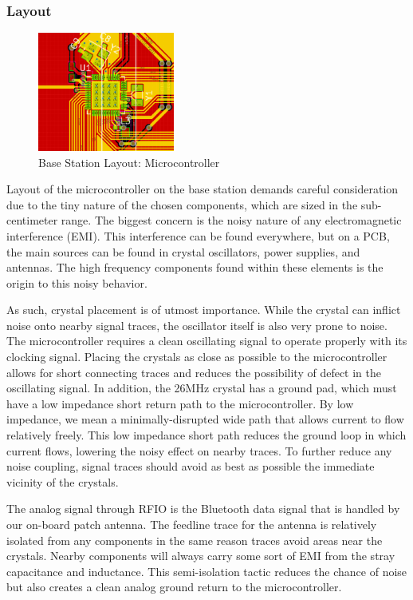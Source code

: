\documentclass[journal,compsoc]{IEEEtran}
\begin{document}
\subsubsection{Layout}

\begin{figure}[ht] 	%
\centering
\includegraphics[width=0.4\textwidth]{base-layout-uc.PNG}
\caption{ \space Base Station Layout: Microcontroller}
\label{base-lay-uc}
\end{figure}

Layout of the microcontroller on the base station demands careful consideration due to the tiny nature of the chosen components, which are sized in the sub-centimeter range. The biggest concern is the noisy nature of any electromagnetic interference (EMI). This interference can be found everywhere, but on a PCB, the main sources can be found in crystal oscillators, power supplies, and antennas. The high frequency components found within these elements is the origin to this noisy behavior.

As such, crystal placement is of utmost importance. While the crystal can inflict noise onto nearby signal traces, the oscillator itself is also very prone to noise. The microcontroller requires a clean oscillating signal to operate properly with its clocking signal. Placing the crystals as close as possible to the microcontroller allows for short connecting traces and reduces the possibility of defect in the oscillating signal. In addition, the 26MHz crystal has a ground pad, which must have a low impedance short return path to the microcontroller. By low impedance, we mean a minimally-disrupted wide path that allows current to flow relatively freely. This low impedance short path reduces the ground loop in which current flows, lowering the noisy effect on nearby traces. To further reduce any noise coupling, signal traces should avoid as best as possible the immediate vicinity of the crystals.

The analog signal through RFIO is the Bluetooth data signal that is handled by our on-board patch antenna. The feedline trace for the antenna is relatively isolated from any components in the same reason traces avoid areas near the crystals. Nearby components will always carry some sort of EMI from the stray capacitance and inductance. This semi-isolation tactic reduces the chance of noise but also creates a clean analog ground return to the microcontroller.
\end{document}
